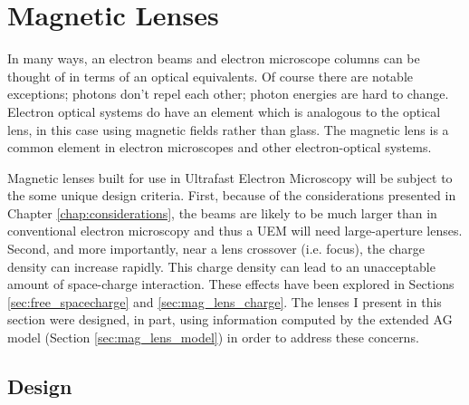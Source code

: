 
\section{Magnetic Lenses} \label{sec:mag_lens}


In many ways, an electron beams and electron microscope columns can be thought of in terms of an optical equivalents. 
Of course there are notable exceptions; photons don't repel each other; photon energies are hard to change.
Electron optical systems do have an element which is analogous to the optical lens, in this case using magnetic fields rather than glass. 
The magnetic lens is a common element in electron microscopes and other electron-optical systems.

Magnetic lenses built for use in Ultrafast Electron Microscopy will be subject to the some unique design criteria.
First, because of the considerations presented in Chapter \ref{chap:considerations}, the beams are likely to be much larger than in conventional electron microscopy and thus a UEM will need large-aperture lenses.
Second, and more importantly, near a lens crossover (i.e. focus), the charge density can increase rapidly.
This charge density can lead to an unacceptable amount of space-charge interaction.
These effects have been explored in Sections \ref{sec:free_spacecharge} and \ref{sec:mag_lens_charge}.
The lenses I present in this section were designed, in part, using information computed by the extended AG model (Section \ref{sec:mag_lens_model}) in order to address these concerns.

\subsection{Design}

